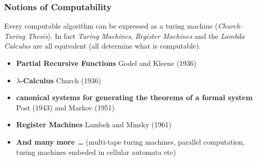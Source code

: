 \subsubsection{Notions of Computability}
Every computable algorithm can be expressed as a turing machine (\textit{Church-Turing Thesis}). In fact \textit{Turing Machines}, \textit{Register Machines} and the \textit{Lambda Calculus} are all equivalent (all determine what is computable).

\begin{itemize}
	\item \textbf{Partial Recursive Functions} Godel and Kleene (1936)
	\item \textbf{$\lambda$-Calculus} Church (1936)
	\item \textbf{canonical systems for generating the theorems of a formal system} Post (1943) and Markov (1951)
	\item \textbf{Register Machines} Lambek and Minsky (1961)
	\item \textbf{And many more \dots} (multi-tape turing machines, parallel computation, turing machines embeded in cellular automata etc)
\end{itemize}